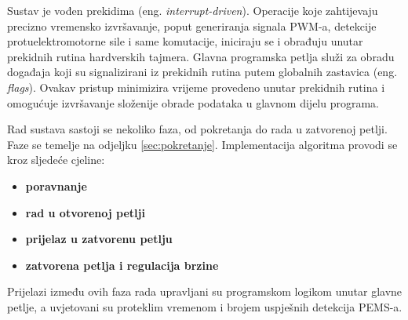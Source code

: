 \documentclass[diplomskirad]{fer}
\begin{document}
Sustav je vođen prekidima (eng. \textit{interrupt-driven}). Operacije koje
zahtijevaju precizno vremensko izvršavanje, poput generiranja signala PWM-a,
detekcije protuelektromotorne sile i same komutacije, iniciraju se i obrađuju
unutar prekidnih rutina hardverskih tajmera. Glavna programska petlja služi za
obradu događaja koji su signalizirani iz prekidnih rutina putem globalnih
zastavica (eng. \textit{flags}). Ovakav pristup minimizira vrijeme provedeno
unutar prekidnih rutina i omogućuje izvršavanje složenije obrade podataka u
glavnom dijelu programa.

Rad sustava sastoji se nekoliko faza, od pokretanja do rada u zatvorenoj
petlji. Faze se temelje na odjeljku \ref{sec:pokretanje}. Implementacija
algoritma provodi se kroz sljedeće cjeline:
\begin{itemize}
	\item \textbf{poravnanje}
	\item \textbf{rad u otvorenoj petlji}
	\item \textbf{prijelaz u zatvorenu petlju}
	\item \textbf{zatvorena petlja i regulacija brzine}
\end{itemize}
Prijelazi između ovih faza rada upravljani su programskom logikom unutar glavne
petlje, a uvjetovani su proteklim vremenom i brojem uspješnih detekcija PEMS-a.

\begin{figure}[h!]
	\centering
\end{figure}
\end{document}
